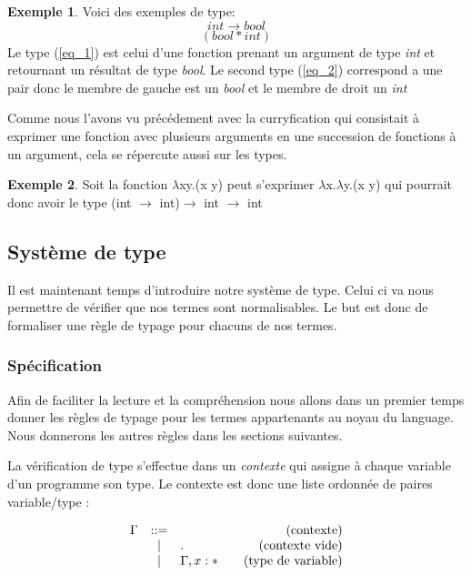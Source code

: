 \documentclass {article}
\makeatletter
\theoremstyle{definition}
\newtheorem{example}{Exemple}
\theoremstyle{remark}
\newenvironment{bnf}
               {\[\begin{array}{lcl@{\qquad}r}}
               {\end{array}\]}
\makeatother
\begin{document}
\begin{example}
  Voici des exemples de type:
  \begin{equation}
    int \rightarrow bool  \label{eq_1} 
  \end{equation}
  \begin{equation}
    (bool * int) \label{eq_2} 
  \end{equation}
  Le type (\ref{eq_1}) est celui d'une fonction prenant un argument de type \emph{int} et 
  retournant un résultat de type \emph{bool}.
  Le second type (\ref{eq_2}) correspond a une pair donc le membre de gauche est un \emph{bool}
  et le membre de droit un \emph{int}
\end{example}

Comme nous l'avons vu précédement avec la curryfication qui consistait à exprimer une 
fonction avec plusieurs arguments en une succession de fonctions à un argument, cela 
se répercute aussi sur les types.

\begin{example}
  Soit la fonction \(\lambda\)x\:y.(x y) peut s'exprimer 
  \(\lambda\)x.\(\lambda\)y.(x y) qui pourrait donc avoir 
  le type (int \(\rightarrow\) int)\(\rightarrow\) int \(\rightarrow\) int
\end{example}

\subsection{Système de type}

Il est maintenant temps d'introduire notre système de type. Celui ci va nous permettre de vérifier que nos termes 
sont normalisables. Le but est donc de formaliser une règle de typage pour chacuns de nos termes.

\subsubsection{Spécification}

Afin de faciliter la lecture et la compréhension nous allons dans 
un premier temps donner les règles de typage pour les termes appartenants au noyau 
du language. Nous donnerons les autres règles dans les sections suivantes.

La vérification de type s'effectue dans un \emph{contexte} qui assigne
à chaque variable d'un programme son type. Le contexte est donc une
liste ordonnée de paires variable/type :
%

\begin{bnf}
  \Gamma &::=& &\mbox{(contexte)} \\
         &|& . & \mbox{(contexte vide)} \\
         &|& \Gamma, x : * & \mbox{(type de variable)} 
\end{bnf}
\end{document}
